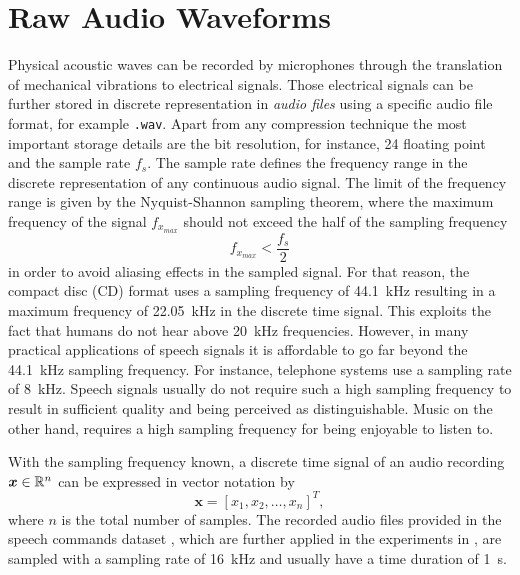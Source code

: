 
\section{Raw Audio Waveforms}\label{sec:signal_raw}
Physical acoustic waves can be recorded by microphones through the translation of mechanical vibrations to electrical signals. 
Those electrical signals can be further stored in discrete representation in \emph{audio files} using a specific audio file format, for example \texttt{.wav}.
Apart from any compression technique the most important storage details are the bit resolution, for instance, \SI{24}{\bit} floating point and the sample rate $f_s$.
The sample rate defines the frequency range in the discrete representation of any continuous audio signal.
The limit of the frequency range is given by the Nyquist-Shannon sampling theorem, where the maximum frequency of the signal $f_{x_{max}}$ should not exceed the half of the sampling frequency
\begin{equation}\label{eq:signal_raw_nyquist}
  f_{x_{max}} < \frac{f_s}{2}
\end{equation}
in order to avoid aliasing effects in the sampled signal.
For that reason, the compact disc (CD) format uses a sampling frequency of \SI{44.1}{\kilo\hertz} resulting in a maximum frequency of \SI{22.05}{\kilo\hertz} in the discrete time signal.
This exploits the fact that humans do not hear above \SI{20}{\kilo\hertz} frequencies.
However, in many practical applications of speech signals it is affordable to go far beyond the \SI{44.1}{\kilo\hertz} sampling frequency. 
For instance, telephone systems use a sampling rate of \SI{8}{\kilo\hertz}.
Speech signals usually do not require such a high sampling frequency to result in sufficient quality and being perceived as distinguishable.
Music on the other hand, requires a high sampling frequency for being enjoyable to listen to.

With the sampling frequency known, a discrete time signal of an audio recording $\bm{x} \in \mathbb{R}^n$ can be expressed in vector notation by
\begin{equation}\label{eq:signal_raw_x}
  \bm{x} = [x_1, x_2, \dots, x_n]^T,
\end{equation}
where $n$ is the total number of samples.
The recorded audio files provided in the speech commands dataset \cite{Warden2018}, which are further applied in the experiments in , are sampled with a sampling rate of \SI{16}{\kilo\hertz} and usually have a time duration of \SI{1}{\second}.

